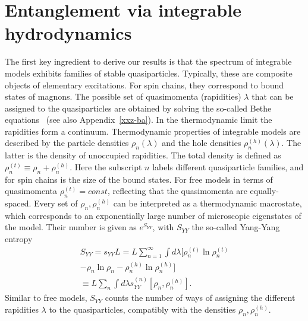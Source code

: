 \documentclass[twocolumn,superscriptaddress,prb,10pt]{revtex4-1}
\begin{document}
\section{Entanglement via integrable hydrodynamics} 
The first key ingredient to derive our results is that the spectrum of integrable models 
exhibits families of stable quasiparticles. Typically, these are composite 
objects of elementary excitations. For spin chains, they correspond to bound states 
of magnons. The possible set of quasimomenta (rapidities) 
$\lambda$ that can be assigned to the quasiparticles are obtained by solving 
the so-called Bethe equations~\cite{taka-book} (see also Appendix~\ref{xxz-ba}). In the thermodynamic limit the 
rapidities form a continuum. Thermodynamic properties of integrable models 
are described by the particle densities $\rho_{n}(\lambda)$ and the hole densities 
$\rho^{\scriptscriptstyle (h)}_{n}(\lambda)$. The latter is the density of 
unoccupied rapidities. The total density 
is defined as $\rho^{\scriptscriptstyle(t)}_{n}\equiv\rho_{n}+\rho^{\scriptscriptstyle(h)}_{n}$. 
Here the subscript $n$ labels different quasiparticle families, and for spin chains is the 
size of the bound states. For free models in terms of quasimomenta 
$\rho_n^{\scriptscriptstyle (t)}=const$, reflecting that the quasimomenta are equally-spaced. 
Every set of $\rho_{n},\rho^{\scriptscriptstyle(h)}_{n}$ can be  
interpreted as a thermodynamic macrostate, which corresponds to an exponentially 
large number of microscopic eigenstates of the model. Their number is given 
as $e^{S_{YY}}$, with $S_{YY}$ the so-called Yang-Yang entropy~\cite{yang-1969} 
%
\begin{multline}
\label{syy}
S_{YY}=s_{YY}L=L\sum_{n=1}^\infty\int d\lambda[\rho_{n}^{\scriptscriptstyle(t)}\ln
\rho_{n}^{\scriptscriptstyle(t)}\\
-\rho_{n}\ln\rho_{n}-\rho_{n}^{\scriptscriptstyle(h)}\ln\rho_{n}^{\scriptscriptstyle(h)}]\\
\equiv L\sum_n\int d\lambda s_{YY}^{(n)}[\rho_{n},\rho_{n}^{\scriptscriptstyle(h)}]. 
\end{multline}
%
Similar to free models, $S_{YY}$ counts the number of ways of assigning the different 
rapidities $\lambda$ to the quasiparticles, compatibly with the densities $\rho_n,
\rho_{n}^{\scriptscriptstyle(h)}$. 
\end{document}
